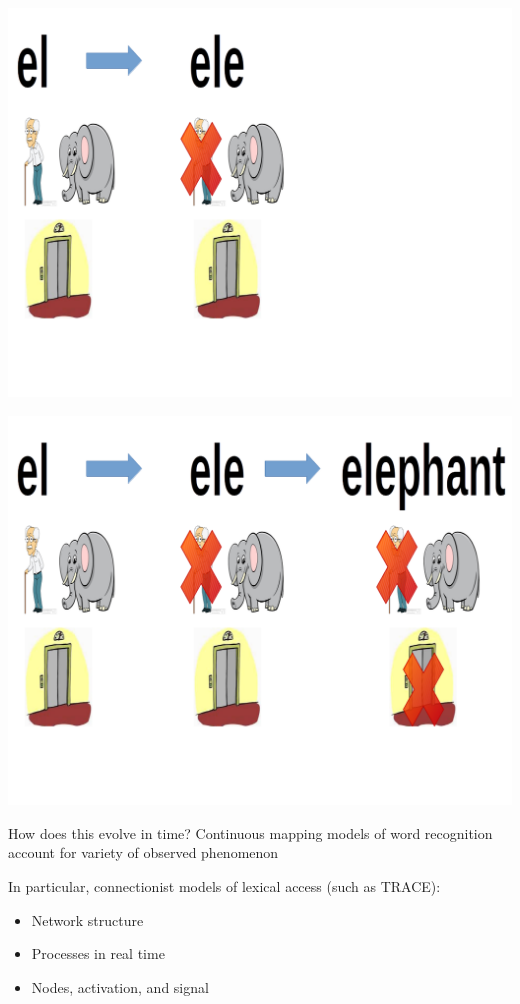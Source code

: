 \documentclass{beamer}
\newcommand{\vp}{\vspace{2mm}}
\begin{document}
\begin{frame}
\begin{center}
\includegraphics[scale=0.3]{img/ele_2.png}
\end{center}
\end{frame}

\begin{frame}
\begin{center}
\includegraphics[scale=0.3]{img/ele_3.png}
\end{center}
\end{frame}



\begin{frame}{How does this evolve in time?} \large
Continuous mapping models of word recognition account for variety of observed phenomenon  \vp


In particular, connectionist models of lexical access (such as TRACE):
\begin{itemize}
\item Network structure
\item Processes in real time
\item Nodes, activation, and signal
\end{itemize}
\end{frame}
\end{document}
